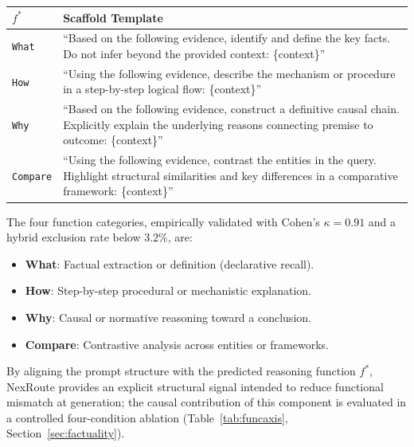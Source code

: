 \documentclass[a4paper,fleql]{cas-sc}
\begin{document}
\vspace{4pt}
\begin{center}
\begingroup
{}
\label{tab:scaffolds}
\renewcommand{\arraystretch}{1.4}
\begin{tabular}{l p{9cm}}
\toprule
$f^*$ & \textbf{Scaffold Template} \\
\midrule
\texttt{What}
  & ``Based on the following evidence, identify and define the key facts.
    Do not infer beyond the provided context: \{context\}'' \\
\midrule
\texttt{How}
  & ``Using the following evidence, describe the mechanism or procedure
    in a step-by-step logical flow: \{context\}'' \\
\midrule
\texttt{Why}
  & ``Based on the following evidence, construct a definitive causal chain.
    Explicitly explain the underlying reasons connecting premise to
    outcome: \{context\}'' \\
\midrule
\texttt{Compare}
  & ``Using the following evidence, contrast the entities in the query.
    Highlight structural similarities and key differences in a comparative
    framework: \{context\}'' \\
\bottomrule
\end{tabular}
\endgroup
\end{center}
\vspace{4pt}

The four function categories, empirically validated with Cohen's $\kappa = 0.91$ and a hybrid exclusion rate below 3.2\%, are:

\begin{itemize}
    \item \textbf{What}: Factual extraction or definition (declarative recall).
    \item \textbf{How}: Step-by-step procedural or mechanistic explanation.
    \item \textbf{Why}: Causal or normative reasoning toward a conclusion.
    \item \textbf{Compare}: Contrastive analysis across entities or frameworks.
\end{itemize}


By aligning the prompt structure with the predicted reasoning function $f^*$,
NexRoute provides an explicit structural signal intended to reduce functional
mismatch at generation; the causal contribution of this component is evaluated
in a controlled four-condition ablation (Table~\ref{tab:funcaxis}, Section~\ref{sec:factuality}).
\end{document}
